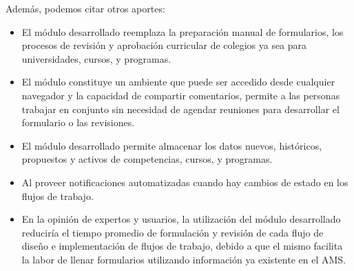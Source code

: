 Además, podemos citar otros aportes:
\begin{itemize}
	\item El módulo desarrollado reemplaza la preparación manual de formularios, los procesos de revisión y aprobación curricular de colegios ya sea para universidades, cursos, y programas.
	\item El módulo constituye un ambiente que puede ser accedido desde cualquier navegador y la capacidad de compartir comentarios, permite a las personas trabajar en conjunto sin necesidad de agendar reuniones para desarrollar el formulario o las revisiones.
	\item El módulo desarrollado permite almacenar los datos nuevos, históricos, propuestos y activos de competencias, cursos, y programas.
	\item Al proveer notificaciones automatizadas cuando hay cambios de estado en los flujos de trabajo.
	\item En la opinión de expertos y usuarios, la utilización del módulo desarrollado reduciría el tiempo promedio de formulación y revisión de cada flujo de diseño e implementación de flujos de trabajo, debido a que el mismo facilita la labor de llenar formularios utilizando información ya existente en el AMS.
\end{itemize}


